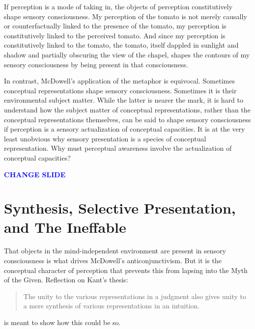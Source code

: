 \documentclass[12pt]{article}
\newcommand{\change}{\textcolor{blue}{\textbf{CHANGE SLIDE}}}
\begin{document}
If perception is a mode of taking in, the objects of perception constitutively shape sensory consciousness. My perception of the tomato is not merely causally or counterfactually linked to the presence of the tomato, my perception is constitutively linked to the perceived tomato. And since my perception is constitutively linked to the tomato, the tomato, itself dappled in sunlight and shadow and partially obscuring the view of the chapel, shapes the contours of my sensory consciousness by being present in that consciousness.

In contrast, McDowell's application of the metaphor is equivocal. Sometimes conceptual representations shape sensory consciousness. Sometimes it is their environmental subject matter. While the latter is nearer the mark, it is hard to understand how the subject matter of conceptual representations, rather than the conceptual representations themselves, can be said to shape sensory consciousness if perception is a sensory actualization of conceptual capacities. It is at the very least unobvious why sensory presentation is a species of conceptual representation. Why must perceptual awareness involve the actualization of conceptual capacities?

\change


\section{Synthesis, Selective Presentation, and The Ineffable} %
\label{sec:selective_presentation_and_synthesis}

That objects in the mind-independent environment are present in sensory consciousness is what drives McDowell's anticonjunctivism. But it is the conceptual character of perception that prevents this from lapsing into the Myth of the Given. Reflection on Kant's thesis:
\begin{quote}
    The unity to the various representations in a judgment also gives unity to a mere synthesis of various representations in an intuition.
\end{quote}
is meant to show how this could be so.
\end{document}
